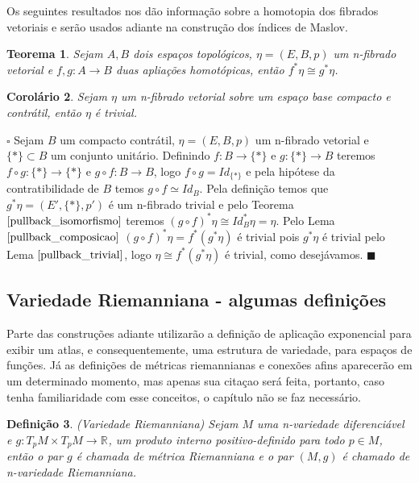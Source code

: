 \documentclass[12pt]{book}
\newtheorem{teorema}{Teorema}[section]
\newtheorem{corolario}[teorema]{Corolário}
\newtheorem{definicao}[teorema]{Definição}
\newenvironment{prova}[1]{$\square$ #1}{\hfill$\blacksquare$}
\newcommand{\real}[1]{\mathbb{R}^{#1}}
\begin{document}
	Os seguintes resultados nos dão informação sobre a homotopia dos fibrados vetoriais e serão usados adiante na construção dos índices de Maslov.
	
	\begin{teorema}\label{pullback_isomorfismo}
		Sejam $A, B$ dois espaços topológicos, $\eta=(E, B, p)$ um n-fibrado vetorial e $f,g: A\to B$ duas apliações homotópicas, então $f^{*}\eta \cong g^{*}\eta$.
	\end{teorema}
	
	\begin{corolario}\label{pullback_contratil}
		Sejam $\eta$ um n-fibrado vetorial sobre um espaço base compacto e contrátil, então $\eta$ é trivial.
	\end{corolario}
	\begin{prova}
		Sejam $B$ um compacto contrátil, $\eta=(E, B, p)$ um n-fibrado vetorial e $\{*\} \subset B$ um conjunto unitário. Definindo $f:B\to \{*\}$ e $g:\{*\}\to B$ teremos $f\circ g : \{*\} \to \{*\}$ e $g\circ f:B\to B$, logo $f\circ g = Id_{\{*\}}$ e pela hipótese da contratibilidade de $B$ temos $g\circ f \simeq Id_{B}$. Pela definição temos que $g^{*}\eta = (E', \{*\}, p')$ é um n-fibrado trivial e pelo Teorema $\ref{pullback_isomorfismo}$ teremos $(g\circ f)^{*}\eta \cong Id_{B}^{*}\eta = \eta$. Pelo Lema $\ref{pullback_composicao}$ $(g\circ f)^{*}\eta = f^{*}(g^{*}\eta) $ é trivial pois $g^{*}\eta$ é trivial pelo Lema $\ref{pullback_trivial}$, logo $ \eta \cong f^{*}(g^{*}\eta)$ é trivial, como desejávamos.
	\end{prova}
	
	\subsection{Variedade Riemanniana - algumas definições}
	Parte das construções adiante utilizarão a definição de aplicação exponencial para exibir um atlas, e consequentemente, uma estrutura de variedade, para espaços de funções. Já as definições de métricas riemannianas e conexões afins aparecerão em um determinado momento, mas apenas sua citaçao será feita, portanto, caso tenha familiaridade com esse conceitos, o capítulo não se faz necessário.
	
	\begin{definicao}\label{definicao_variedade_riemanniana}
		(Variedade Riemanniana) Sejam $M$ uma n-variedade diferenciável e $g:T_{p}M \times T_{p}M \to \real{}$, um produto interno positivo-definido para todo $p \in M$, então o par $g$ é chamada de métrica Riemanniana e o par $(M, g)$ é chamado de n-variedade Riemanniana.
	\end{definicao}
	
\end{document}

